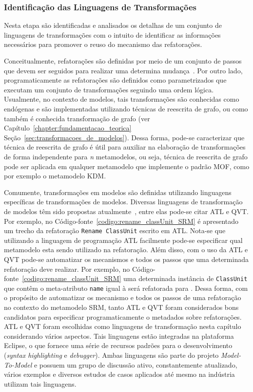 \subsubsection{Identificação das Linguagens de Transformações}

Nesta etapa são identificadas e analisados os detalhas de um conjunto de linguagens de transformações com o intuito de identificar as informações necessários para promover o reuso do mecanismo das refatorações. 

Conceitualmente, refatorações são definidas por meio de um conjunto de passos que devem ser seguidos para realizar uma determina mudança~\cite{Fowler1999, Demeyer1}. Por outro lado, programaticamente as refatorações são definidos como  parametrizados que executam um conjunto de transformações seguindo uma ordem lógica. Usualmente, no contexto de modelos, tais transformações são conhecidas como endógenas e são implementadas utilizando técnicas de reescrita de grafo, ou como também é conhecida transformação de grafo (ver Capítulo~\ref{chapter:fundamentacao_teorica} Seção~\ref{sec:transformacoes_de_modelos}). Dessa forma, pode-se caracterizar que técnica de reescrita de grafo é útil para auxiliar na elaboração de transformações de forma independente para \textit{n} metamodelos, ou seja, técnica de reescrita de grafo pode ser aplicada em qualquer metamodelo que implemente o padrão MOF, como por exemplo o metamodelo KDM. 

Comumente, transformações em modelos são definidas utilizando linguagens específicas de transformações de modelos. Diversas linguagens de transformação de modelos têm sido propostas atualmente~\cite{Biehl_2010, Allilaire_06}, entre elas pode-se citar ATL e QVT. Por exemplo, no Código-fonte~\ref{codigo:rename_classUnit_SRM} é apresentado um trecho da refatoração \texttt{Rename ClassUnit} escrito em ATL. Nota-se que utilizando a linguagem de programação ATL facilmente pode-se especificar qual metamodelo esta sendo utilizado na refatoração. Além disso, com o uso da ATL e QVT pode-se automatizar os mecanismos e todos os passos que uma determinada refatoração deve realizar. Por exemplo, no Código-fonte~\ref{codigo:rename_classUnit_SRM} uma determinada instância de \texttt{ClassUnit} que contêm o meta-atributo \texttt{name} igual à  será refatorada para . Dessa forma, com o propósito de automatizar os mecanismo e todos os passos de uma refatoração no contexto do metamodelo SRM, tanto ATL e QVT foram considerados bons candidatos para especificar programaticamente o metadados sobre refatorações. ATL e QVT foram escolhidas como linguagens de transformação nesta capítulo considerando vários aspectos. Tais linguagens estão integradas na plataforma Eclipse, o que fornece uma série de recursos padrões para o desenvolvimento (\textit{syntax highlighting} e \textit{debugger}). Ambas linguagens são parte do projeto \textit{Model-To-Model} e possuem um grupo de discussão ativo, constantemente atualizado, vários exemplos e diversos estudos de casos aplicados até mesmo na indústria utilizam tais linguagens.


